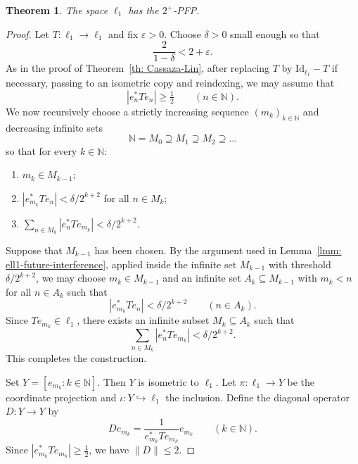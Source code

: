 \documentclass[11pt]{amsart}
\theoremstyle{plain}
\newtheorem{theorem}{Theorem}[section]
\theoremstyle{definition}
\numberwithin{equation}{section}
\newcommand{\norm}[1]{\lVert #1 \rVert}
\newcommand{\N}{\mathbb{N}}
\newcommand{\Id}{\mathrm{Id}}
\renewcommand{\le}{\leqslant}
\renewcommand{\ge}{\geqslant}
\begin{document}
\begin{theorem}\label{th: ell1-case}
    The space $\ell_1$ has the $2^+$-PFP.
\end{theorem}
\begin{proof}
    Let $T\colon \ell_1 \to \ell_1$ and fix $\varepsilon>0$. Choose $\delta>0$ small enough so that
    \[
    \frac{2}{1-\delta}<2+\varepsilon.
    \]
    As in the proof of Theorem~\ref{th: Cassaza-Lin}, after replacing $T$ by $\Id_{\ell_1}-T$ if necessary, passing to an isometric copy and reindexing, we may assume that
    \[
    |e_n^*Te_n|\ge \tfrac12
    \qquad(n\in\N).
    \]
    We now recursively choose a strictly increasing sequence $(m_k)_{k\in\N}$ and decreasing infinite sets
    \[
    \N=M_0\supseteq M_1\supseteq M_2\supseteq\ldots
    \]
    so that for every $k\in\N$:
    \begin{enumerate}[label=(\roman*), ref=(\roman*)]
        \item $m_k\in M_{k-1}$;
        \item $|e_{m_k}^*Te_n|<\delta/2^{k+2}$ for all $n\in M_k$;
        \item $\sum_{n\in M_k}|e_n^*Te_{m_k}|<\delta/2^{k+2}$.
    \end{enumerate}
    Suppose that $M_{k-1}$ has been chosen. By the argument used in Lemma~\ref{lmm: ell1-future-interference}, applied inside the infinite set $M_{k-1}$ with threshold $\delta/2^{k+2}$, we may choose $m_k\in M_{k-1}$ and an infinite set $A_k\subseteq M_{k-1}$ with $m_k<n$ for all $n\in A_k$ such that
    \[
    |e_{m_k}^*Te_n|<\delta/2^{k+2}
    \qquad(n\in A_k).
    \]
    Since $Te_{m_k}\in\ell_1$, there exists an infinite subset $M_k\subseteq A_k$ such that
    \[
    \sum_{n\in M_k}|e_n^*Te_{m_k}|<\delta/2^{k+2}.
    \]
    This completes the construction.
    
    Set $Y=[e_{m_k}:k\in\N]$. Then $Y$ is isometric to $\ell_1$. Let $\pi\colon \ell_1\to Y$ be the coordinate projection and $\iota\colon Y\hookrightarrow \ell_1$ the inclusion. Define the diagonal operator $D\colon Y\to Y$ by
    \[
    De_{m_k}=\frac{1}{e_{m_k}^*Te_{m_k}}e_{m_k}
    \qquad(k\in\N).
    \]
    Since $|e_{m_k}^*Te_{m_k}|\ge \tfrac12$, we have $\norm{D}\le 2$.
    

\end{proof}
\end{document}
